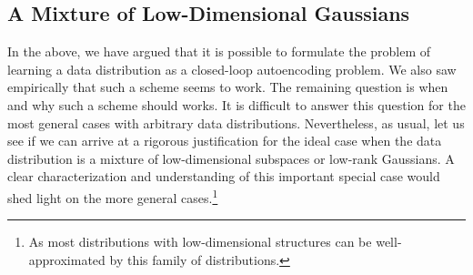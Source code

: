 \documentclass[\toplevelprefix/book-main.tex]{subfiles}
\begin{document}

\subsection{A Mixture of Low-Dimensional Gaussians}

In the above, we have argued that it is possible to formulate the problem of learning a data distribution as a closed-loop autoencoding problem. We also saw empirically that such a scheme seems to work. The remaining question is when and why such a scheme should works. It is difficult to answer this question for the most general cases with arbitrary data distributions. Nevertheless, as usual, let us see if we can arrive at a rigorous justification for the ideal case when the data distribution is a mixture of low-dimensional subspaces or low-rank Gaussians. A clear characterization and understanding of this important special case would shed light on the more general cases.\footnote{As most distributions with low-dimensional structures can be well-approximated by this family of distributions.}
\end{document}
